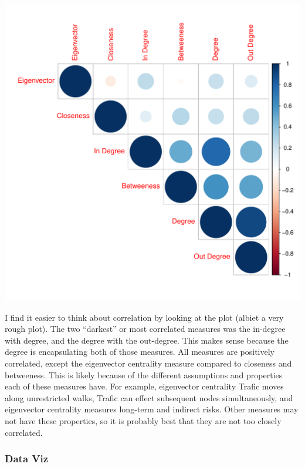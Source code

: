 \documentclass[12pt]{article}\usepackage[]{graphicx}\usepackage[]{color}
\makeatletter
\newenvironment{kframe}{%
 \def\at@end@of@kframe{}%
 \ifinner\ifhmode%
  \def\at@end@of@kframe{\end{minipage}}%
  \begin{minipage}{\columnwidth}%
 \fi\fi%
 \def\FrameCommand##1{\hskip\@totalleftmargin \hskip-\fboxsep
 \colorbox{shadecolor}{##1}\hskip-\fboxsep
     \hskip-\linewidth \hskip-\@totalleftmargin \hskip\columnwidth}%
 \MakeFramed {\advance\hsize-\width
   \@totalleftmargin\z@ \linewidth\hsize
   \@setminipage}}%
 {\par\unskip\endMakeFramed%
 \at@end@of@kframe}
\newenvironment{knitrout}{}{} %
\makeatother
\begin{document}
\begin{flushleft}
\begin{center}
\begin{knitrout}
\begin{kframe}
\begin{alltt}
\end{alltt}
\end{kframe}
\includegraphics[width=6in]{figure/comp-1} 

\end{knitrout}
\end{center}


I find it easier to think about correlation by looking at the plot (albiet a very rough plot). The two ``darkest'' or most correlated measures was the in-degree with degree, and the degree with the out-degree. This makes sense because the degree is encapsulating both of those measures. All measures are positively correlated, except the eigenvector centrality measure compared to closeness and betweeness. This is likely because of the different assumptions and properties each of these measures have. For example, eigenvector centrality Trafic moves along unrestricted walks, Trafic can effect subsequent nodes simultaneously, and eigenvector centrality measures long-term and indirect risks. Other measures may not have these properties, so it is probably best that they are not too closely correlated.


\subsubsection{Data Viz}


\end{flushleft}
\end{document}

